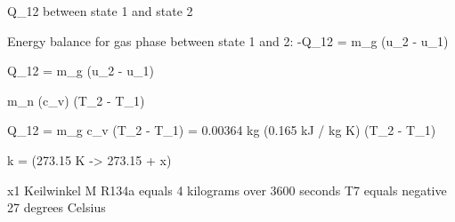 Q_12 between state 1 and state 2

Energy balance for gas phase between state 1 and 2:
-Q_12 = m_g (u_2 - u_1)

Q_12 = m_g (u_2 - u_1)

m_n (c_v) (T_2 - T_1)

Q_12 = m_g c_v (T_2 - T_1)
= 0.00364 kg (0.165 kJ / kg K) (T_2 - T_1)

k = (273.15 K -> 273.15 + x)

x1 Keilwinkel  
M R134a equals 4 kilograms over 3600 seconds  
T7 equals negative 27 degrees Celsius
